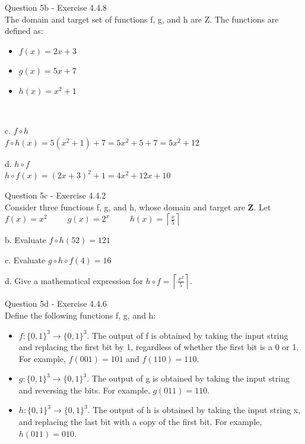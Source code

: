 \documentclass[OPONE]{example}
\begin{document}
\noindent Question 5b - Exercise 4.4.8 \\

The domain and target set of functions f, g, and h are Z. The functions are defined as:
	\begin{itemize}
		\item{$f(x) = 2x + 3$}
		\item{$g(x) = 5x + 7$}
		\item{$h(x) = x^{2} + 1$} 
	\end{itemize} \\

\begin{list}{}{}
	
	\item{c.}
	$f \circ h$ \\
	$f \circ h(x) = 5(x^{2} + 1)  + 7 = 5x^{2} + 5 + 7 = 5x^{2} + 12$
	
	\item{d.}
	$h \circ f$ \\
	$h \circ f(x) = (2x + 3)^{2} + 1 = 4x^{2} + 12x + 10$	
	
\end{list}

\noindent Question 5c - Exercise 4.4.2 \\

Consider three functions f, g, and h, whose domain and target are \textbf{Z}. Let \\

$f(x) = x^2~~~~~~~~~~~g(x) = 2^x~~~~~~~~~~~h(x) = \left\lceil \frac x 5 \right\rceil$


\begin{list}{}{}
	
	\item{b.}
	Evaluate $f \circ h(52) = 121$	
	
	\item{c.}
	Evaluate $g \circ h \circ f(4) = 16$	
	
	\item{d.}
	Give a mathematical expression for $h \circ f = \left\lceil \frac{x^{2}}{5}\right\rceil$.
	
\end{list}

\noindent Question 5d - Exercise 4.4.6 \\

Define the following functions f, g, and h:
\begin{itemize}
	\item $f: \{0, 1\}^{3} \rightarrow \{0, 1\}^{3}$. The output of f is obtained by taking the input string and replacing the first bit by 1, regardless of whether the first bit is a 0 or 1. For example, $f(001) = 101$ and $f(110) = 110$.
	
	\item $g: \{0, 1\}^{3} \rightarrow \{0, 1\}^{3}$. The output of g is obtained by taking the input string and reversing the bits. For example, $g(011) = 110$.
	
	\item $h: \{0, 1\}^{3} \rightarrow \{0, 1\}^{3}$. The output of h is obtained by taking the input string x, and replacing the last bit with a copy of the first bit. For example, $h(011) = 010$.
\end{itemize}
\end{document}
